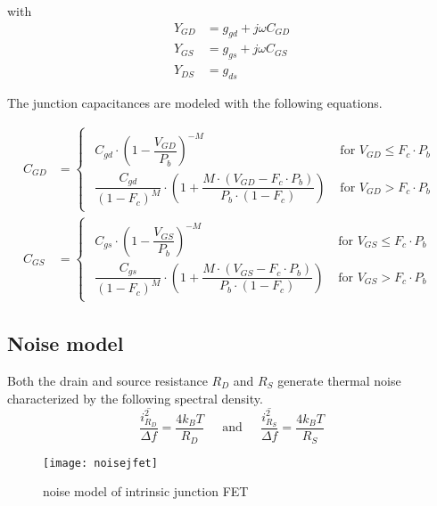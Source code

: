 with
\begin{align}
Y_{GD} &= g_{gd} + j\omega C_{GD}\\
Y_{GS} &= g_{gs} + j\omega C_{GS}\\
Y_{DS} &= g_{ds}
\end{align}

The junction capacitances are modeled with the following equations.

\begin{align}
C_{GD} &= 
\begin{cases}
\begin{array}{ll}
C_{gd}\cdot \left(1 - \dfrac{V_{GD}}{P_{b}}\right)^{-M} & \textrm{ for } V_{GD} \le F_{c}\cdot P_{b}\\
\dfrac{C_{gd}}{\left(1 - F_{c}\right)^{M}}\cdot \left(1 + \dfrac{M\cdot \left(V_{GD} - F_{c}\cdot P_{b}\right)}{P_{b}\cdot \left(1 - F_{c}\right)}\right) & \textrm{ for } V_{GD} > F_{c}\cdot P_{b}
\end{array}
\end{cases}\\
C_{GS} &= 
\begin{cases}
\begin{array}{ll}
C_{gs}\cdot \left(1 - \dfrac{V_{GS}}{P_{b}}\right)^{-M} & \textrm{ for } V_{GS} \le F_{c}\cdot P_{b}\\
\dfrac{C_{gs}}{\left(1 - F_{c}\right)^{M}}\cdot \left(1 + \dfrac{M\cdot \left(V_{GS} - F_{c}\cdot P_{b}\right)}{P_{b}\cdot \left(1 - F_{c}\right)}\right) & \textrm{ for } V_{GS} > F_{c}\cdot P_{b}
\end{array}
\end{cases}
\end{align}

\subsection{Noise model}

Both the drain and source resistance $R_D$ and $R_S$ generate thermal
noise characterized by the following spectral density.
\begin{equation}
\dfrac{\overline{i_{R_D}^2}}{\Delta f} = \dfrac{4 k_B T}{R_D}
\;\;\;\; \textrm{ and } \;\;\;\;
\dfrac{\overline{i_{R_S}^2}}{\Delta f} = \dfrac{4 k_B T}{R_S}
\end{equation}

\begin{figure}[ht]
\begin{center}
\texttt{[image: noisejfet]}
\end{center}
\caption{noise model of intrinsic junction FET}
\label{fig:noisejfet}
\end{figure}
\FloatBarrier

